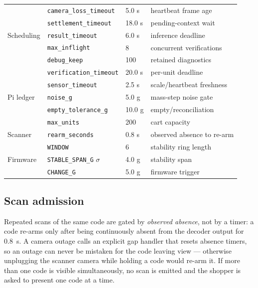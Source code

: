 \documentclass[conference]{IEEEtran}
\begin{document}
\begin{table}[!t]
\begin{tabular}{@{}llll@{}}
\midrule
\multirow{5}{*}{Scheduling}
 & \texttt{camera\_loss\_timeout} & 5.0 s & heartbeat frame age \\
 & \texttt{settlement\_timeout} & 18.0 s & pending-context wait \\
 & \texttt{result\_timeout} & 6.0 s & inference deadline \\
 & \texttt{max\_inflight} & 8 & concurrent verifications \\
 & \texttt{debug\_keep} & 100 & retained diagnostics \\
\midrule
\multirow{5}{*}{Pi ledger}
 & \texttt{verification\_timeout} & 20.0 s & per-unit deadline \\
 & \texttt{sensor\_timeout} & 2.5 s & scale/heartbeat freshness \\
 & \texttt{noise\_g} & 5.0 g & mass-step noise gate \\
 & \texttt{empty\_tolerance\_g} & 10.0 g & empty/reconciliation \\
 & \texttt{max\_units} & 200 & cart capacity \\
\midrule
Scanner & \texttt{rearm\_seconds} & 0.8 s & observed absence to re-arm \\
\midrule
\multirow{3}{*}{Firmware}
 & \texttt{WINDOW} & 6 & stability ring length \\
 & \texttt{STABLE\_SPAN\_G} $\sigma$ & 4.0 g & stability span \\
 & \texttt{CHANGE\_G} & 5.0 g & firmware trigger \\
\bottomrule
\end{tabular}
\end{table}

\subsection{Scan admission}
Repeated scans of the same code are gated by \emph{observed absence}, not by a timer: a code re-arms
only after being continuously absent from the decoder output for $0.8$~s. A camera outage calls an
explicit gap handler that resets absence timers, so an outage can never be mistaken for the code
leaving view --- otherwise unplugging the scanner camera while holding a code would re-arm it. If more
than one code is visible simultaneously, no scan is emitted and the shopper is asked to present one
code at a time.
\end{document}
